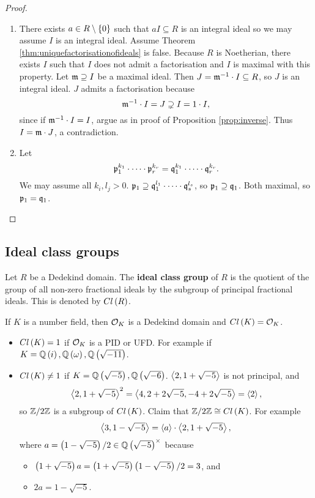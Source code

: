 \begin{proof}
\hfill
\begin{enumerate}
\item There exists $ a \in R \setminus \left\{ 0 \right\} $ such that $ aI \subseteq R $ is an integral ideal so we may assume $ I $ is an integral ideal. Assume Theorem \ref{thm:uniquefactorisationofideals} is false. Because $ R $ is Noetherian, there exists $ I $ such that $ I $ does not admit a factorisation and $ I $ is maximal with this property. Let $ \mathfrak{m} \supseteq I $ be a maximal ideal. Then $ J = \mathfrak{m}^{-1} \cdot I \subseteq R $, so $ J $ is an integral ideal. $ J $ admits a factorisation because
$$ \mathfrak{m}^{-1} \cdot I = J \supsetneq I = 1 \cdot I, $$
since if $ \mathfrak{m}^{-1} \cdot I = I $, argue as in proof of Proposition \ref{prop:inverse}. Thus $ I = \mathfrak{m} \cdot J $, a contradiction.
\item Let
$$ \mathfrak{p}_1^{k_1} \cdot \dots \cdot \mathfrak{p}_r^{k_r} = \mathfrak{q}_1^{k_1} \cdot \dots \cdot \mathfrak{q}_r^{k_r}. $$
We may assume all $ k_i, l_j > 0 $. $ \mathfrak{p}_1 \supseteq \mathfrak{q}_1^{l_1} \cdot \dots \cdot \mathfrak{q}_s^{l_s} $, so $ \mathfrak{p}_1 \supseteq \mathfrak{q}_1 $. Both maximal, so $ \mathfrak{p}_1 = \mathfrak{q}_1 $.
\end{enumerate}
\end{proof}


\subsection{Ideal class groups}

\begin{definition}
Let $ R $ be a Dedekind domain. The \textbf{ideal class group} of $ R $ is the quotient of the group of all non-zero fractional ideals by the subgroup of principal fractional ideals. This is denoted by $ Cl\left( R \right) $.
\end{definition}

If $ K $ is a number field, then $ \mathcal{O}_K $ is a Dedekind domain and $ Cl\left( K \right) = \mathcal{O}_K $.

\begin{example*}
\hfill
\begin{itemize}
\item $ Cl\left( K \right) = 1 $ if $ \mathcal{O}_K $ is a PID or UFD. For example if $ K = \mathbb{Q}\left( i \right), \mathbb{Q}\left( \omega \right), \mathbb{Q}\left( \sqrt{-11} \right) $.
\item $ Cl\left( K \right) \ne 1 $ if $ K = \mathbb{Q}\left( \sqrt{-5} \right), \mathbb{Q}\left( \sqrt{-6} \right) $. $ \left\langle 2, 1 + \sqrt{-5} \right\rangle $ is not principal, and
$$ \left\langle 2, 1 + \sqrt{-5} \right\rangle^2 = \left\langle 4, 2 + 2\sqrt{-5}, -4 + 2\sqrt{-5} \right\rangle = \left\langle 2 \right\rangle, $$
so $ \mathbb{Z} / 2\mathbb{Z} $ is a subgroup of $ Cl\left( K \right) $. Claim that $ \mathbb{Z} / 2\mathbb{Z} \cong Cl\left( K \right) $. For example
$$ \left\langle 3, 1 - \sqrt{-5} \right\rangle = \left\langle a \right\rangle \cdot \left\langle 2, 1 + \sqrt{-5} \right\rangle, $$
where $ a = \left( 1 - \sqrt{-5} \right) / 2 \in \mathbb{Q}\left( \sqrt{-5} \right)^\times $ because
\begin{itemize}
\item $ \left( 1 + \sqrt{-5} \right)a = \left( 1 + \sqrt{-5} \right)\left( 1 - \sqrt{-5} \right) / 2 = 3 $, and
\item $ 2a = 1 - \sqrt{-5} $.
\end{itemize}
\end{itemize}
\end{example*}

